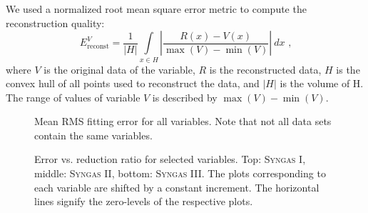 %
%
We used a normalized root mean square error metric to compute the reconstruction
quality:
%
\begin{equation*}
	E^V_\text{reconst}
		= 	\frac{1}{|H|}
			\int\limits_{x \in H} 			
				\left|
					\frac{R(x) - V(x)}{\max(V)-\min(V)}
				\right| ~dx
			 \text{ ,}
\end{equation*}
%
where $V$ is the original data of the variable, $R$ is the reconstructed data,
$H$ is the convex hull of all points used to reconstruct the data, and $|H|$ is
the volume of H. The range of values of variable $V$ is described by
$\max(V)-\min(V)$.

%
\begin{figure}[t]
	\centering
	\setlength\figureheight{0.2\textheight}
	\setlength{}
	
	\caption{Mean \ac{RMS} fitting error for all variables. Note that not all data sets
	contain the same variables.}
	\label{fig:fitting_rms_error}
\end{figure}
%
%
\begin{figure}[p]
	\setlength\figureheight{0.26\textheight}
	\setlength{}
	
	\caption{
	Error vs. reduction ratio for selected variables. Top: \textsc{Syngas I},
	middle: \textsc{Syngas II}, bottom: \textsc{Syngas III}. The plots
	corresponding to each variable are shifted by a constant increment. The
	horizontal lines signify the zero-levels of the respective plots.}
	\label{fig:CRvMSE}
\end{figure}

